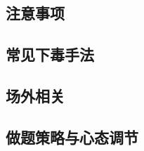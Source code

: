 \documentclass[a4paper]{article}
\begin{document}
\begin{multicols}{2}
			\section{注意事项}
				\subsection{常见下毒手法}
					

				\subsection{场外相关}
					

				\subsection{做题策略与心态调节}
					

	\end{multicols}
\end{document}
